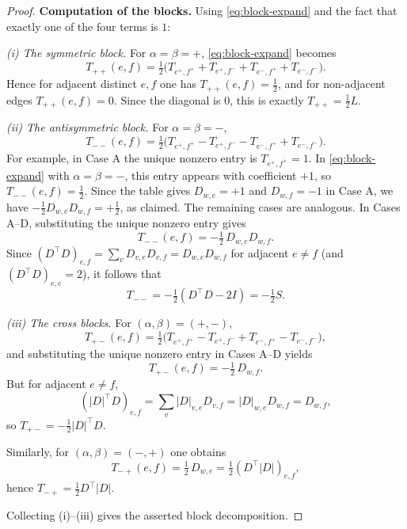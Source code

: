 \documentclass[10pt,a4paper]{amsart}
\begin{document}
\begin{proof}
\medskip
\noindent\textbf{Computation of the blocks.}
Using \eqref{eq:block-expand} and the fact that exactly one of the four terms is $1$:

\smallskip
\noindent\emph{(i) The symmetric block.}
For $\alpha=\beta=+$, \eqref{eq:block-expand} becomes
\[
T_{++}(e,f)=\tfrac12\bigl(T_{e^+,f^+}+T_{e^+,f^-}+T_{e^-,f^+}+T_{e^-,f^-}\bigr).
\]
Hence for adjacent distinct $e,f$ one has $T_{++}(e,f)=\tfrac12$, and for non-adjacent
edges $T_{++}(e,f)=0$. Since the diagonal is $0$, this is exactly $T_{++}=\tfrac12 L$.

\smallskip
\noindent\emph{(ii) The antisymmetric block.}
For $\alpha=\beta=-$,
\[
T_{--}(e,f)=\tfrac12\bigl(T_{e^+,f^+}-T_{e^+,f^-}-T_{e^-,f^+}+T_{e^-,f^-}\bigr).
\]
For example, in Case A the unique nonzero entry is $T_{e^+,f^+}=1$.
In \eqref{eq:block-expand} with $\alpha=\beta=-$, this entry appears with coefficient $+1$,
so $T_{--}(e,f)=\tfrac12$. Since the table gives $D_{w,e}=+1$ and $D_{w,f}=-1$ in Case A,
we have $-\tfrac12 D_{w,e}D_{w,f}=+\tfrac12$, as claimed. The remaining cases are analogous.
In Cases A--D, substituting the unique nonzero entry gives
\[
T_{--}(e,f)= -\tfrac12\,D_{w,e}D_{w,f}.
\]
Since $(D^\top D)_{e,f}=\sum_{v}D_{v,e}D_{v,f}=D_{w,e}D_{w,f}$ for adjacent $e\neq f$
(and $(D^\top D)_{e,e}=2$), it follows that
\[
T_{--} = -\tfrac12(D^\top D-2I)= -\tfrac12 S.
\]

\smallskip
\noindent\emph{(iii) The cross blocks.}
For $(\alpha,\beta)=(+,-)$,
\[
T_{+-}(e,f)=\tfrac12\bigl(T_{e^+,f^+}-T_{e^+,f^-}+T_{e^-,f^+}-T_{e^-,f^-}\bigr),
\]
and substituting the unique nonzero entry in Cases A--D yields
\[
T_{+-}(e,f)= -\tfrac12\,D_{w,f}.
\]
But for adjacent $e\neq f$,
\[
(|D|^\top D)_{e,f}=\sum_v |D|_{v,e}D_{v,f} = |D|_{w,e}D_{w,f}=D_{w,f},
\]
so $T_{+-}=-\tfrac12|D|^\top D$.

Similarly, for $(\alpha,\beta)=(-,+)$ one obtains
\[
T_{-+}(e,f)= \tfrac12\,D_{w,e}=\tfrac12(D^\top|D|)_{e,f},
\]
hence $T_{-+}=\tfrac12 D^\top|D|$.

Collecting (i)--(iii) gives the asserted block decomposition.
\end{proof}
\end{document}
